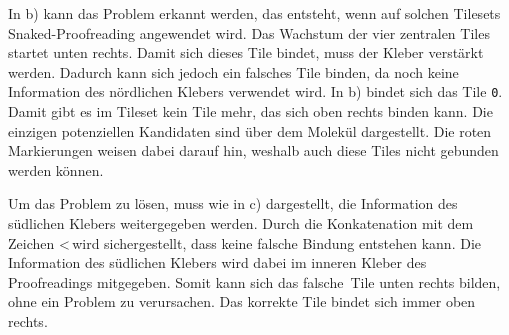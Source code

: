 In b) kann das Problem erkannt werden, das entsteht, wenn auf solchen Tilesets Snaked-Proofreading angewendet wird. Das Wachstum der vier zentralen Tiles startet unten rechts. Damit sich dieses Tile bindet, muss der Kleber verstärkt werden. Dadurch kann sich jedoch ein falsches Tile binden, da noch keine Information des nördlichen Klebers verwendet wird. In b) bindet sich das Tile \texttt{0}. Damit gibt es im Tileset kein Tile mehr, das sich oben rechts binden kann. Die einzigen potenziellen Kandidaten sind über dem Molekül dargestellt. Die roten Markierungen weisen dabei darauf hin, weshalb auch diese Tiles nicht gebunden werden können.

Um das Problem zu lösen, muss wie in c) dargestellt, die Information des südlichen Klebers weitergegeben werden. Durch die Konkatenation mit dem Zeichen \glqq <\grqq\,wird sichergestellt, dass keine falsche Bindung entstehen kann. Die Information des südlichen Klebers wird dabei im inneren Kleber des Proofreadings mitgegeben. Somit kann sich das \glqq falsche\grqq\, Tile unten rechts bilden, ohne ein Problem zu verursachen. Das korrekte Tile bindet sich immer oben rechts.

